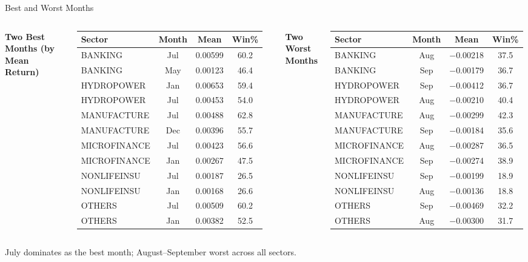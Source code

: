 \documentclass[10pt, aspectratio=169]{beamer}
\begin{document}
\begin{frame}{Best and Worst Months}
\begin{columns}[T]
\centering
\textbf{Two Best Months (by Mean Return)}
\smallskip
\scriptsize
\begin{tabular}{lccc}
\toprule
Sector & Month & Mean & Win\% \\
\midrule
BANKING      & Jul & 0.00599 & 60.2 \\
BANKING      & May & 0.00123 & 46.4 \\
HYDROPOWER   & Jan & 0.00653 & 59.4 \\
HYDROPOWER   & Jul & 0.00453 & 54.0 \\
MANUFACTURE  & Jul & 0.00488 & 62.8 \\
MANUFACTURE  & Dec & 0.00396 & 55.7 \\
MICROFINANCE & Jul & 0.00423 & 56.6 \\
MICROFINANCE & Jan & 0.00267 & 47.5 \\
NONLIFEINSU  & Jul & 0.00187 & 26.5 \\
NONLIFEINSU  & Jan & 0.00168 & 26.6 \\
OTHERS       & Jul & 0.00509 & 60.2 \\
OTHERS       & Jan & 0.00382 & 52.5 \\
\bottomrule
\end{tabular}
\centering
\textbf{Two Worst Months}
\smallskip
\scriptsize
\begin{tabular}{lccc}
\toprule
Sector & Month & Mean & Win\% \\
\midrule
BANKING      & Aug & $-$0.00218 & 37.5 \\
BANKING      & Sep & $-$0.00179 & 36.7 \\
HYDROPOWER   & Sep & $-$0.00412 & 36.7 \\
HYDROPOWER   & Aug & $-$0.00210 & 40.4 \\
MANUFACTURE  & Aug & $-$0.00299 & 42.3 \\
MANUFACTURE  & Sep & $-$0.00184 & 35.6 \\
MICROFINANCE & Aug & $-$0.00287 & 36.5 \\
MICROFINANCE & Sep & $-$0.00274 & 38.9 \\
NONLIFEINSU  & Sep & $-$0.00199 & 18.9 \\
NONLIFEINSU  & Aug & $-$0.00136 & 18.8 \\
OTHERS       & Sep & $-$0.00469 & 32.2 \\
OTHERS       & Aug & $-$0.00300 & 31.7 \\
\bottomrule
\end{tabular}
\end{columns}
\vspace{0.15cm}
\small July dominates as the best month; August--September worst across all sectors.
\end{frame}
\end{document}
